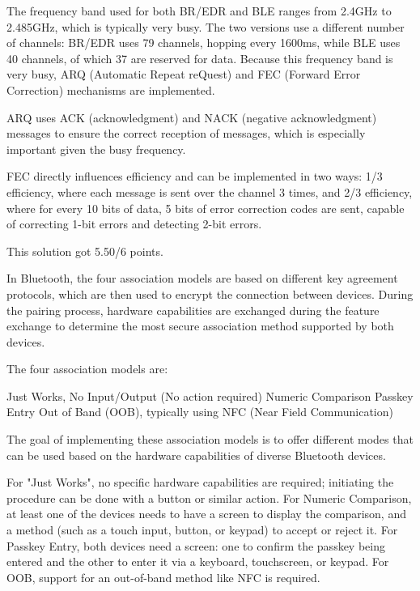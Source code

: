 \begin{questions}
\begin{solution}
        The frequency band used for both BR/EDR and BLE ranges from 2.4GHz to 2.485GHz, which is typically very busy. The two versions use a different number of channels: BR/EDR uses 79 channels, hopping every 1600ms, while BLE uses 40 channels, of which 37 are reserved for data. Because this frequency band is very busy, ARQ (Automatic Repeat reQuest) and FEC (Forward Error Correction) mechanisms are implemented.

        ARQ uses ACK (acknowledgment) and NACK (negative acknowledgment) messages to ensure the correct reception of messages, which is especially important given the busy frequency.

        FEC directly influences efficiency and can be implemented in two ways: 1/3 efficiency, where each message is sent over the channel 3 times, and 2/3 efficiency, where for every 10 bits of data, 5 bits of error correction codes are sent, capable of correcting 1-bit errors and detecting 2-bit errors.
    \end{solution}


    \begin{solution}
        This solution got 5.50/6 points.

        In Bluetooth, the four association models are based on different key agreement protocols, which are then used to encrypt the connection between devices. During the pairing process, hardware capabilities are exchanged during the feature exchange to determine the most secure association method supported by both devices.

        The four association models are:

        Just Works, No Input/Output (No action required)
        Numeric Comparison
        Passkey Entry
        Out of Band (OOB), typically using NFC (Near Field Communication)

        The goal of implementing these association models is to offer different modes that can be used based on the hardware capabilities of diverse Bluetooth devices.

        For "Just Works", no specific hardware capabilities are required; initiating the procedure can be done with a button or similar action. For Numeric Comparison, at least one of the devices needs to have a screen to display the comparison, and a method (such as a touch input, button, or keypad) to accept or reject it. For Passkey Entry, both devices need a screen: one to confirm the passkey being entered and the other to enter it via a keyboard, touchscreen, or keypad. For OOB, support for an out-of-band method like NFC is required.
    \end{solution}



\end{questions}

